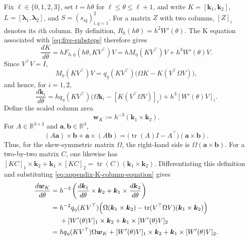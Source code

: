 \documentclass[]{article}
\numberwithin{equation}{section}
\theoremstyle{plain}
\theoremstyle{remark}
\begin{document}
Fix $\ell\in\{0,1,2,3\}$, set $t=h\theta$ for
$\ell\le\theta\le\ell+1$, and write
$K=[\boldsymbol k_1,\boldsymbol k_2]$,
$L=[\boldsymbol\lambda_1,\boldsymbol\lambda_2]$, and
$S=(s_{iq})_{i,q=1}^2$.  For a matrix $Z$ with two columns,
$[Z]_i$ denotes its $i$th column.  By definition,
$R_h(h\theta)=h^2W'(\theta)$.
The K equation associated with \eqref{eq:five-substeps} therefore gives
\begin{equation}\label{eq:appendix-K-equation}
 \frac{dK}{d\theta}
 =hF_{h,\eta}(h\theta,KV^\top)V
 =hM_\eta(KV^\top)V+h^3W'(\theta)V.
\end{equation}
Since $V^\top V=I$,
\begin{equation}\label{eq:appendix-K-columns}
 M_\eta(KV^\top)V
 =q_\eta(KV^\top)\bigl(\Omega K-K(V^\top\Omega V)\bigr),
\end{equation}
and hence, for $i=1,2$,
\begin{equation}\label{eq:appendix-K-column-equation}
 \frac{d\boldsymbol k_i}{d\theta}
 =hq_\eta(KV^\top)
  \bigl(\Omega\boldsymbol k_i-[K(V^\top\Omega V)]_i\bigr)
  +h^3[W'(\theta)V]_i.
\end{equation}
Define the scaled column area
\begin{equation}\label{eq:appendix-K-area-definition}
 \boldsymbol w_K:=h^{-3}(\boldsymbol k_1\times\boldsymbol k_2).
\end{equation}
For $A\in\mathbb R^{3\times3}$ and
$\boldsymbol a,\boldsymbol b\in\mathbb R^3$,
\begin{equation}\label{eq:cross-product-linear-identity}
 (A\boldsymbol a)\times\boldsymbol b
 +\boldsymbol a\times(A\boldsymbol b)
 =\bigl(\operatorname{tr}(A)I-A^\top\bigr)
  (\boldsymbol a\times\boldsymbol b).
\end{equation}
Thus, for the skew-symmetric matrix $\Omega$, the right-hand side is
$\Omega(\boldsymbol a\times\boldsymbol b)$.  For a two-by-two matrix
$C$, one likewise has
$[KC]_1\times\boldsymbol k_2+\boldsymbol k_1\times[KC]_2
=\operatorname{tr}(C)(\boldsymbol k_1\times\boldsymbol k_2)$.
Differentiating this definition and substituting
\eqref{eq:appendix-K-column-equation} gives
\begin{equation}\label{eq:appendix-normalized-K}
\begin{aligned}
 \frac{d\boldsymbol w_K}{d\theta}
={}&h^{-3}\left(
 \frac{d\boldsymbol k_1}{d\theta}\times\boldsymbol k_2
 +\boldsymbol k_1\times\frac{d\boldsymbol k_2}{d\theta}
 \right)\\
={}&h^{-2}q_\eta(KV^\top)\Bigl(
 \Omega(\boldsymbol k_1\times\boldsymbol k_2)
 -\operatorname{tr}(V^\top\Omega V)
  (\boldsymbol k_1\times\boldsymbol k_2)\Bigr)\\
 &+[W'(\theta)V]_1\times\boldsymbol k_2
 +\boldsymbol k_1\times[W'(\theta)V]_2\\
={}&hq_\eta(KV^\top)\Omega\boldsymbol w_K
 +[W'(\theta)V]_1\times\boldsymbol k_2
 +\boldsymbol k_1\times[W'(\theta)V]_2.
\end{aligned}
\end{equation}
\end{document}
